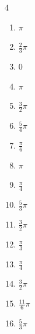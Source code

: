 \begin{multicols}{4}
\begin{enumerate}
  \item $\displaystyle \pi$

  \item $\displaystyle \frac{2}{3}\pi$

\columnbreak %

  \item $\displaystyle 0$

  \item $\displaystyle \pi$

  \item $\displaystyle \frac{3}{2}\pi$

  \item $\displaystyle \frac{5}{4}\pi$

  \item $\displaystyle \frac{\pi}{6}$

  \item $\displaystyle \pi$

  \item $\displaystyle \frac{\pi}{4}$

  \item $\displaystyle \frac{5}{3}\pi$

  \item $\displaystyle \frac{3}{2}\pi$

  \item $\displaystyle \frac{\pi}{3}$

  \item $\displaystyle \frac{\pi}{4}$

  \item $\displaystyle \frac{3}{2}\pi$

  \item $\displaystyle \frac{11}{6}\pi$

  \item $\displaystyle \frac{5}{3}\pi$


\end{enumerate}
\end{multicols}
